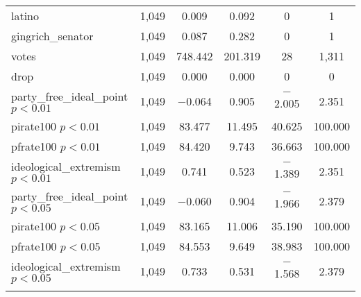 \documentclass[12pt]{article}
\begin{document}
\begin{table}[!htbp]
\begin{tabular}{@{\extracolsep{5pt}}lccccc}
		latino & 1,049 & 0.009 & 0.092 & 0 & 1 \\ 
		gingrich\_senator & 1,049 & 0.087 & 0.282 & 0 & 1 \\ 
		votes & 1,049 & 748.442 & 201.319 & 28 & 1,311 \\ 
		drop & 1,049 & 0.000 & 0.000 & 0 & 0 \\ 
		\hline
		party\_free\_ideal\_point $ p < 0.01 $ & 1,049 & $-$0.064 & 0.905 & $-$2.005 & 2.351 \\ 
		pirate100 $ p < 0.01 $ & 1,049 & 83.477 & 11.495 & 40.625 & 100.000 \\ 
		pfrate100 $ p < 0.01 $ & 1,049 & 84.420 & 9.743 & 36.663 & 100.000 \\ 
		ideological\_extremism $ p < 0.01 $ & 1,049 & 0.741 & 0.523 & $-$1.389 & 2.351 \\ 
		\hline
		party\_free\_ideal\_point $ p < 0.05 $ & 1,049 & $-$0.060 & 0.904 & $-$1.966 & 2.379 \\ 
		pirate100 $ p < 0.05 $ & 1,049 & 83.165 & 11.006 & 35.190 & 100.000 \\ 
		pfrate100 $ p < 0.05 $ & 1,049 & 84.553 & 9.649 & 38.983 & 100.000 \\ 
		ideological\_extremism $ p < 0.05 $ & 1,049 & 0.733 & 0.531 & $-$1.568 & 2.379 \\ 
		\hline \\[-1.8ex] 
	\end{tabular} 
\end{table} 
\end{document}
